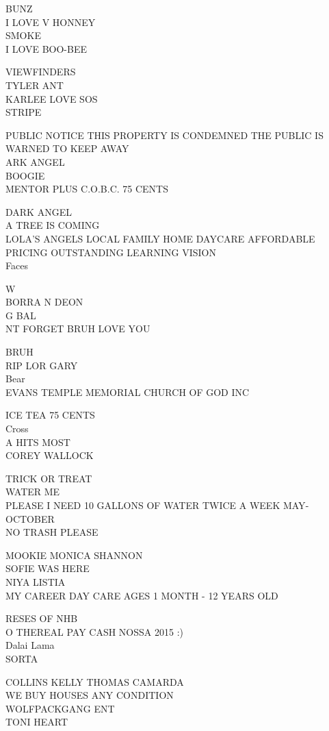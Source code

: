 \documentclass[10pt,letterpaper]{article}
\begin{document}
BUNZ\\
I LOVE V HONNEY\\
SMOKE\\
I LOVE BOO{-}BEE

VIEWFINDERS\\
TYLER ANT\\
KARLEE LOVE SOS\\
STRIPE

PUBLIC NOTICE THIS PROPERTY IS CONDEMNED THE PUBLIC IS WARNED TO KEEP AWAY\\
ARK ANGEL\\
BOOGIE\\
MENTOR PLUS C.O.B.C. 75 CENTS

DARK ANGEL\\
A TREE IS COMING\\
LOLA'S ANGELS LOCAL FAMILY HOME DAYCARE AFFORDABLE PRICING OUTSTANDING LEARNING VISION\\
Faces

W\\
BORRA N DEON\\
G BAL\\
NT FORGET BRUH LOVE YOU

BRUH\\
RIP LOR GARY\\
Bear\\
EVANS TEMPLE MEMORIAL CHURCH OF GOD INC

ICE TEA 75 CENTS\\
Cross\\
A HITS MOST\\
COREY WALLOCK

TRICK OR TREAT\\
WATER ME\\
PLEASE I NEED 10 GALLONS OF WATER TWICE A WEEK MAY{-}OCTOBER\\
NO TRASH PLEASE

MOOKIE MONICA SHANNON\\
SOFIE WAS HERE\\
NIYA LISTIA\\
MY CAREER DAY CARE AGES 1 MONTH {-} 12 YEARS OLD

RESES OF NHB\\
O THEREAL PAY CASH NOSSA 2015 :)\\
Dalai Lama\\
SORTA

COLLINS KELLY THOMAS CAMARDA\\
WE BUY HOUSES ANY CONDITION\\
WOLFPACKGANG ENT\\
TONI HEART
\end{document}
